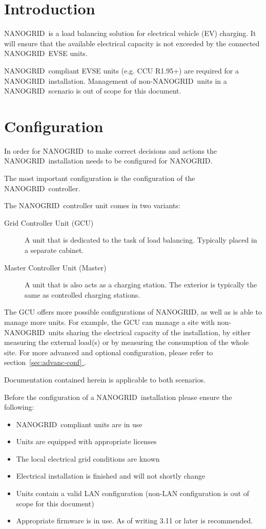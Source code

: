 \documentclass[10pt,a4paper,oneside,headings=big,headsepline]{scrreprt}
\newcommand{\nanogrid}{NANOGRID\texttrademark}
\newcommand*{\fullref}[1]{\hyperref[{#1}]{\autoref*{#1} \nameref*{#1}}}
\begin{document}
\section{Introduction}

\nanogrid\ is a load balancing solution for electrical vehicle (EV)
charging. It will ensure that the available electrical capacity is not
exceeded by the connected \nanogrid\ EVSE units.

\nanogrid\ compliant EVSE units (e.g. CCU R1.95+) are required for a
\nanogrid\ installation. Management of non-\nanogrid\ units in a \nanogrid\
scenario is out of scope for this document.


\section{Configuration}

In order for \nanogrid\ to make correct decisions and actions the
\nanogrid\ installation needs to be configured for \nanogrid.

The most important configuration is the configuration of the \nanogrid\
controller.

The  \nanogrid\ controller unit comes in two variants:

\begin{description}
\item[Grid Controller Unit (GCU)] A unit that is dedicated to the task of load
  balancing. Typically placed in a separate cabinet.
\item[Master Controller Unit (Master)] A unit that is also acts as a charging
  station. The exterior is typically the same as controlled charging stations.
\end{description}

The GCU offers more possible configurations of \nanogrid, as well as is able
to manage more units. For example, the GCU can manage a site with
non-\nanogrid\ units sharing the electrical capacity of the installation, by
either measuring the external load(s) or by measuring the consumption of the
whole site. For more advanced and optional configuration, please refer to
section~\fullref{sec:advanc-conf}.


Documentation contained herein is applicable to both scenarios.

Before the configuration of a \nanogrid\ installation please ensure the
following:

\begin{itemize}
\item \nanogrid\ compliant units are in use
\item Units are equipped with appropriate licenses
\item The local electrical grid conditions are known
\item Electrical installation is finished and will not shortly change
\item Units contain a valid LAN configuration (non-LAN configuration is out of
  scope for this document)
\item Appropriate firmware is in use. As of writing 3.11 or later is
  recommended.
\end{itemize}
\end{document}
